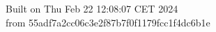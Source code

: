 {\noindent Built on Thu Feb 22 12:08:07 CET 2024} \\ 
 {\noindent from 55adf7a2cc06c3e2f87b7f0f1179fcc1f4dc6b1e}
